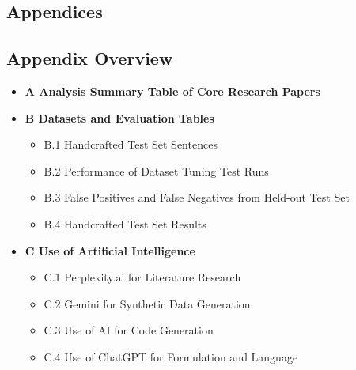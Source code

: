 \appendix

\begin{appendices}
\chapter*{Appendices}

\section*{Appendix Overview}

\begin{itemize}
\item[] \textbf{A Analysis Summary Table of Core Research Papers}
\item[] \textbf{B Datasets and Evaluation Tables}
\begin{itemize}
    \item[] B.1 Handcrafted Test Set Sentences
    \item[] B.2 Performance of Dataset Tuning Test Runs
    \item[] B.3 False Positives and False Negatives from Held-out Test Set
    \item[] B.4 Handcrafted Test Set Results
\end{itemize}

\item[] \textbf{C Use of Artificial Intelligence}
\begin{itemize}
    \item[] C.1 Perplexity.ai for Literature Research
    \item[] C.2 Gemini for Synthetic Data Generation
    \item[] C.3 Use of AI for Code Generation
    \item[] C.4 Use of ChatGPT for Formulation and Language
\end{itemize}
\end{itemize}





\renewcommand{\thesection}{\Alph{section}}





\end{appendices}

